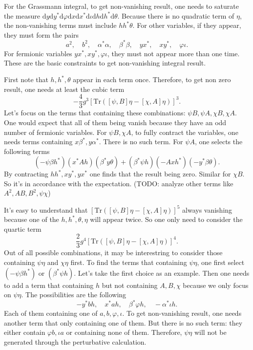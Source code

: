 For the Grassmann integral, to get non-vanishing result, one needs to saturate the measure $\mathrm{d}y \mathrm{d}y^* \mathrm{d}\varphi \mathrm{d}x \mathrm{d}x^* \mathrm{d}\iota \mathrm{d}h \mathrm{d}h^* \mathrm{d}\theta$.
Because there is no quadratic term of $\eta$, the non-vanishing terms must include $hh^*\theta$.
For other variables, if they appear, they must form the pairs
\[
a^2,\quad b^2,\quad \alpha^* \alpha,\quad \beta^* \beta,\quad y x^*,\quad x y^*,\quad \varphi \iota
.\]
For fermionic variables $yx^*,xy^*,\varphi\iota$, they must not appear more than one time.
These are the basic constraints to get non-vanishing integral result.

First note that $h,h^*,\theta$ appear in each term once.
Therefore, to get non zero result, one needs at least the cubic term
\[
	- \frac{4}{3} g^3 \left[\mathrm{Tr}([\psi,B]\eta - [\chi,A]\eta)\right]^3
.\] 
Let's focus on the terms that containing these combinations: $\psi B, \psi A, \chi B, \chi A$. One would expect that all of them being vanish because they have an odd number of fermionic variables. For $\psi B, \chi A$, to fully contract the variables, one needs terms containing $x\beta^*,y\alpha^*$. There is no such term. For $\psi A$, one selects the following terms
\[
	(-\psi \beta h^*)(x^* A h)(\beta^* y \theta) + (\beta^* \psi h) (- A x h^*) (- y^* \beta \theta)
.\] 
By contracting $hh^*,xy^*,yx^*$ one finds that the result being zero.
Similar for $\chi B$. So it's in accordance with the expectation.
(TODO: analyze other terms like $A^2,AB,B^2,\psi\chi$)

It's easy to understand that $\left[\mathrm{Tr}([\psi,B]\eta - [\chi,A]\eta)\right]^5$ always vanishing because one of the $h,h^*,\theta,\eta$ will appear twice. So one only need to consider the quartic term
\[
\frac{2}{3} g^4 \left[\mathrm{Tr}([\psi,B]\eta - [\chi,A]\eta)\right]^4
.\] 
Out of all possible combinations, it may be interestring to consider those containing $\psi\eta$ and $\chi\eta$ first.
To find the terms that containing $\psi\eta$, one first select $(-\psi\beta h^*)$ or $(\beta^* \psi h)$.
Let's take the first choice as an example.
Then one needs to add a term that containing $h$ but not containing $A,B,\chi$ because we only focus on $\psi\eta$.
The possibilities are the following
\[
	- y^* b h,\quad x^* a h,\quad \beta^* \varphi h,\quad -\alpha^* \iota h
.\] 
Each of them containing one of $a,b,\varphi,\iota$.
To get non-vanishing result, one needs another term that only containing one of them.
But there is no such term: they either contain $\varphi b,\iota a$ or containing none of them.
Therefore, $\psi\eta$ will not be generated through the perturbative calculation.

